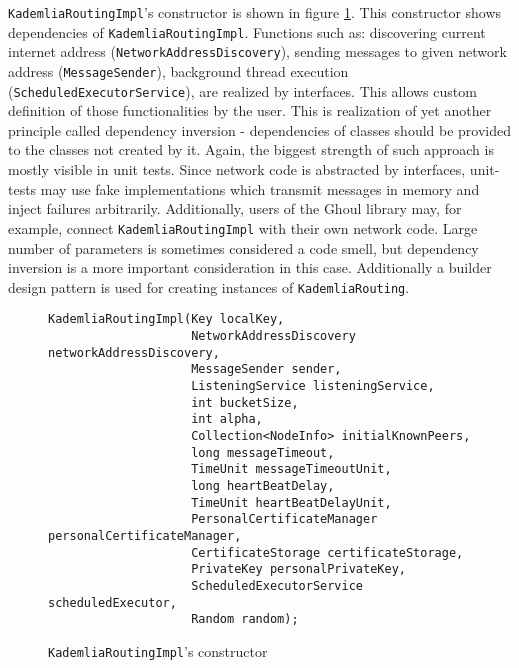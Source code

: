 {\texttt{KademliaRoutingImpl}'s constructor} is shown in figure \ref{fig:routing_constr_header}.
This constructor shows dependencies of \texttt{KademliaRoutingImpl}.
Functions such as: discovering current internet address
(\texttt{NetworkAddressDiscovery}), sending messages to given network address
(\texttt{MessageSender}), background thread execution
(\texttt{ScheduledExecutorService}), are realized by interfaces.
This allows custom definition of those functionalities by the user.
This is realization of yet another principle called dependency inversion - dependencies of classes should be provided to the classes not created by it.
Again, the biggest strength of such approach is mostly visible in unit tests.
Since network code is abstracted by interfaces, unit-tests may use fake implementations which transmit messages in memory and inject failures arbitrarily.
Additionally, users of the Ghoul library may, for example, connect \texttt{KademliaRoutingImpl} with their own network code.
Large number of parameters is sometimes considered a code smell, but dependency inversion is a more important consideration in this case.
Additionally a builder design pattern is used for creating instances of \texttt{KademliaRouting}.

\begin{figure}[tbp]
\begin{lstlisting}
KademliaRoutingImpl(Key localKey,
                    NetworkAddressDiscovery networkAddressDiscovery,
                    MessageSender sender,
                    ListeningService listeningService,
                    int bucketSize,
                    int alpha,
                    Collection<NodeInfo> initialKnownPeers,
                    long messageTimeout,
                    TimeUnit messageTimeoutUnit,
                    long heartBeatDelay,
                    TimeUnit heartBeatDelayUnit,
                    PersonalCertificateManager personalCertificateManager,
                    CertificateStorage certificateStorage,
                    PrivateKey personalPrivateKey,
                    ScheduledExecutorService scheduledExecutor,
                    Random random);
\end{lstlisting}
\caption{\texttt{KademliaRoutingImpl}'s constructor}
\label{fig:routing_constr_header}
\end{figure}
